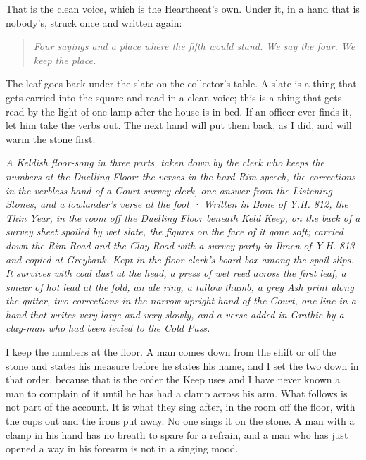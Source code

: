 \documentclass{design/chronicle}
\begin{document}
That is the clean voice, which is the Hearthseat’s own. Under it, in a hand that is nobody’s, struck once and written again:

\begin{quote}\itshape Four sayings and a place where the fifth would stand. We say the four. We keep the place.\end{quote}

The leaf goes back under the slate on the collector’s table. A slate is a thing that gets carried into the square and read in a clean voice; this is a thing that gets read by the light of one lamp after the house is in bed. If an officer ever finds it, let him take the verbs out. The next hand will put them back, as I did, and will warm the stone first.

\clearpage{}
{\centering\FellFont\itshape\footnotesize\color{faded} A Keldish floor-song in three parts, taken down by the clerk who keeps the numbers at the Duelling Floor; the verses in the hard Rim speech, the corrections in the verbless hand of a Court survey-clerk, one answer from the Listening Stones, and a lowlander’s verse at the foot · Written in Bone of Y.H. 812, the Thin Year, in the room off the Duelling Floor beneath Keld Keep, on the back of a survey sheet spoiled by wet slate, the figures on the face of it gone soft; carried down the Rim Road and the Clay Road with a survey party in Ilmen of Y.H. 813 and copied at Greybank. Kept in the floor-clerk’s board box among the spoil slips. It survives with coal dust at the head, a press of wet reed across the first leaf, a smear of hot lead at the fold, an ale ring, a tallow thumb, a grey Ash print along the gutter, two corrections in the narrow upright hand of the Court, one line in a hand that writes very large and very slowly, and a verse added in Grathic by a clay-man who had been levied to the Cold Pass.\par}\medskip
I keep the numbers at the floor. A man comes down from the shift or off the stone and states his measure before he states his name, and I set the two down in that order, because that is the order the Keep uses and I have never known a man to complain of it until he has had a clamp across his arm. What follows is not part of the account. It is what they sing after, in the room off the floor, with the cups out and the irons put away. No one sings it on the stone. A man with a clamp in his hand has no breath to spare for a refrain, and a man who has just opened a way in his forearm is not in a singing mood.
\end{document}
